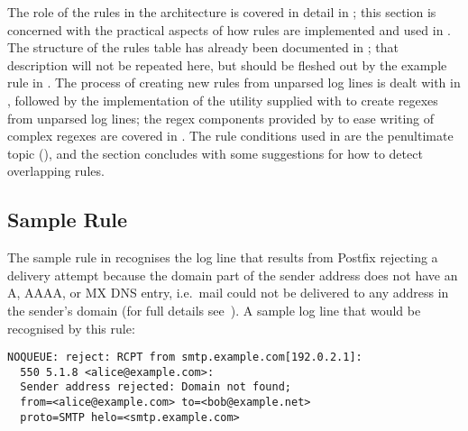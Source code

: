 The role of the rules in the architecture is covered in detail in
; this section is concerned with the
practical aspects of how rules are implemented and used in \parsername{}.
The structure of the rules table has already been documented in
; that description will not be repeated here, but
should be fleshed out by the example rule in .  The process of creating new rules from unparsed log lines
is dealt with in ,
followed by the implementation of the utility supplied with \parsername{}
to create regexes from unparsed log lines; the regex components provided by
\parsername{} to ease writing of complex regexes are covered in
.  The rule conditions used in \parsername{}
are the penultimate topic (),
and the section concludes with some suggestions for how to detect
overlapping rules.

\subsection{Sample Rule}

\label{example rule in implementation}

The sample rule in 
recognises the log line that results from Postfix rejecting a delivery
attempt because the domain part of the sender address does not have an A,
AAAA, or MX DNS entry, i.e.\ mail could not be delivered to any address in
the sender's domain (for full details
see~\cite{reject-unknown-sender-domain}).  A sample log line that would be
recognised by this rule:


\begin{verbatim}
NOQUEUE: reject: RCPT from smtp.example.com[192.0.2.1]:
  550 5.1.8 <alice@example.com>:
  Sender address rejected: Domain not found;
  from=<alice@example.com> to=<bob@example.net>
  proto=SMTP helo=<smtp.example.com>
\end{verbatim}

